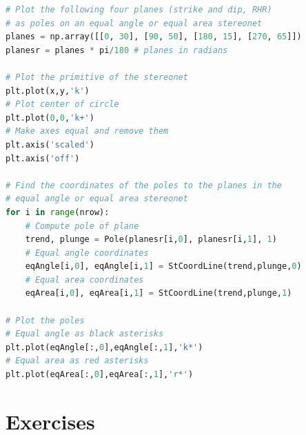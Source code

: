 \documentclass[a4paper , 12pt]{book}
\begin{document}
\begin{center}
\begin{lstlisting}[language=Python, frame=single]
# Plot the following four planes (strike and dip, RHR)
# as poles on an equal angle or equal area stereonet
planes = np.array([[0, 30], [90, 50], [180, 15], [270, 65]])
planesr = planes * pi/180 # planes in radians

# Plot the primitive of the stereonet
plt.plot(x,y,'k')
# Plot center of circle
plt.plot(0,0,'k+')
# Make axes equal and remove them
plt.axis('scaled')
plt.axis('off')

# Find the coordinates of the poles to the planes in the
# equal angle or equal area stereonet
for i in range(nrow):
    # Compute pole of plane
    trend, plunge = Pole(planesr[i,0], planesr[i,1], 1)
    # Equal angle coordinates
    eqAngle[i,0], eqAngle[i,1] = StCoordLine(trend,plunge,0) 
    # Equal area coordinates
    eqArea[i,0], eqArea[i,1] = StCoordLine(trend,plunge,1)

# Plot the poles
# Equal angle as black asterisks
plt.plot(eqAngle[:,0],eqAngle[:,1],'k*')
# Equal area as red asterisks
plt.plot(eqArea[:,0],eqArea[:,1],'r*')
\end{lstlisting}
\end{center}

\section{Exercises}
\end{document}
